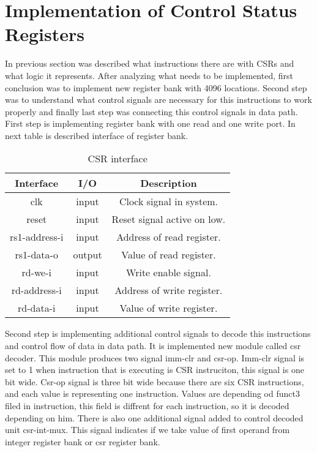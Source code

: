 \documentclass{scrreprt}
\begin{document}
\section*{Implementation of Control Status Registers}
In previous section was described what instructions there are with CSRs and what logic it represents. After analyzing what needs to be implemented, first conclusion was to implement new register bank with 4096 locations. Second step was to understand what control signals are necessary for this instructions to work properly and finally last step was connecting this control signals in data path. 
First step is implementing register bank with one read and one write port. In next table is described interface of register bank. 
\begin{table}[htb!]
            \centering
            \begin{tabular}{|c|c|c|} \hline 
             Interface & I/O & Description \\ \hline  
             clk & input & Clock signal in system. \\ \hline
             reset & input & Reset signal active on low.  \\ \hline
             rs1-address-i & input & Address of read register.  \\ \hline
             rs1-data-o & output & Value of read register.  \\ \hline
             rd-we-i & input & Write enable signal.  \\ \hline
             rd-address-i & input & Address of write register.  \\ \hline
             rd-data-i & input & Value of write register.  \\ \hline
        \end{tabular}
        \caption{CSR interface}
        \label{tab:csrI}
    \end{table}
Second step is implementing additional control signals to decode this instructions and control flow of data in data path. It is implemented new module called csr decoder. This module produces two signal imm-clr and csr-op. Imm-clr signal is set to 1 when instruction that is executing is CSR instruciton, this signal is one bit wide. Csr-op signal is three bit wide because there are six CSR instructions, and each value is representing one instruction. Values are depending od funct3 filed in instruction, this field is diffrent for each instruction, so it is decoded depending on him. 
\newline
There is also one additional signal added to control decoded unit csr-int-mux. This signal indicates if we take value of first operand from integer register bank or csr register bank. 
\end{document}
